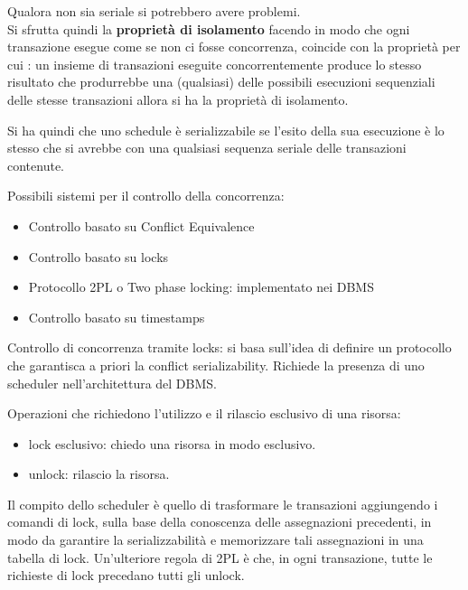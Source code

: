 Qualora non sia seriale si potrebbero avere problemi.\\
Si sfrutta quindi la \textbf{proprietà di isolamento} facendo in modo che ogni transazione esegue come se non ci fosse concorrenza, coincide con la proprietà per cui : un insieme di transazioni eseguite concorrentemente produce lo stesso risultato che produrrebbe una (qualsiasi) delle possibili esecuzioni sequenziali delle stesse transazioni allora si ha la proprietà di isolamento.

Si ha quindi che uno schedule è serializzabile se l'esito della sua esecuzione è lo stesso che si avrebbe con una qualsiasi sequenza seriale delle transazioni contenute.

Possibili sistemi per il controllo della concorrenza:
\begin{itemize}
    \item Controllo basato su Conflict Equivalence
    \item Controllo basato su locks
    \item Protocollo 2PL o Two phase locking: implementato nei DBMS
    \item Controllo basato su timestamps
\end{itemize}

Controllo di concorrenza tramite locks: si basa sull’idea di definire un protocollo che garantisca a priori la conflict serializability. Richiede la presenza di uno scheduler nell’architettura del DBMS.

Operazioni che richiedono l’utilizzo e il rilascio esclusivo di una risorsa:
\begin{itemize}
    \item lock esclusivo: chiedo una risorsa in modo esclusivo.
    \item unlock: rilascio la risorsa.
\end{itemize}

Il compito dello scheduler è quello di trasformare le transazioni aggiungendo i comandi di lock, sulla base della conoscenza delle assegnazioni precedenti, in modo da garantire la serializzabilità e memorizzare tali assegnazioni in una tabella di lock.
Un’ulteriore regola di 2PL è che, in ogni transazione, tutte le richieste di lock precedano tutti gli unlock.

